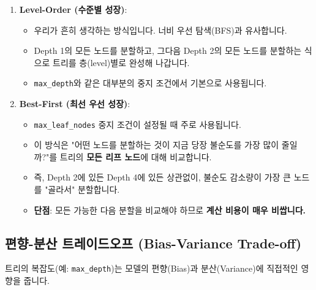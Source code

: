 \documentclass[11pt,a4paper]{book}
\theoremstyle{definition}
\begin{document}
\begin{enumerate}
    \item \textbf{Level-Order (수준별 성장)}:
        \begin{itemize}
            \item 우리가 흔히 생각하는 방식입니다. 너비 우선 탐색(BFS)과 유사합니다.
            \item Depth 1의 모든 노드를 분할하고, 그다음 Depth 2의 모든 노드를 분할하는 식으로 트리를 층(level)별로 완성해 나갑니다.
            \item \texttt{max\_depth}와 같은 대부분의 중지 조건에서 기본으로 사용됩니다.
        \end{itemize}
    \item \textbf{Best-First (최선 우선 성장)}:
        \begin{itemize}
            \item \texttt{max\_leaf\_nodes} 중지 조건이 설정될 때 주로 사용됩니다.
            \item 이 방식은 "어떤 노드를 분할하는 것이 지금 당장 불순도를 가장 많이 줄일까?"를 트리의 \textbf{모든 리프 노드}에 대해 비교합니다.
            \item 즉, Depth 2에 있든 Depth 4에 있든 상관없이, 불순도 감소량이 가장 큰 노드를 "골라서" 분할합니다.
            \item \textbf{단점}: 모든 가능한 다음 분할을 비교해야 하므로 \textbf{계산 비용이 매우 비쌉니다.}
        \end{itemize}
\end{enumerate}

\subsection{편향-분산 트레이드오프 (Bias-Variance Trade-off)}

트리의 복잡도(예: \texttt{max\_depth})는 모델의 편향(Bias)과 분산(Variance)에 직접적인 영향을 줍니다.
\end{document}
